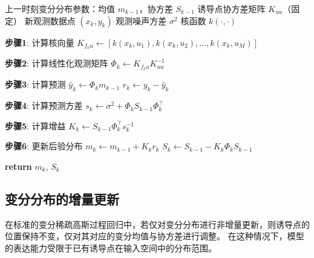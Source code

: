 \begin{algorithm}[htbp]
    \caption{在线变分稀疏高斯过程更新}
    \label{alg:online_vsgp_update}
    \begin{algorithmic}[1]
        \Require 
        \Statex 上一时刻变分分布参数：均值 $m_{k-1}$，协方差 $S_{k-1}$
        \Statex 诱导点协方差矩阵 $K_{uu}$（固定）
        \Statex 新观测数据点 $(x_k, y_k)$
        \Statex 观测噪声方差 $\sigma^2$
        \Statex 核函数 $k(\cdot, \cdot)$
        
        
            \State \textbf{步骤1}: 计算核向量
            \State $K_{f_k u} \gets [k(x_k, u_1), k(x_k, u_2), \ldots, k(x_k, u_M)]$ 
            
            \State \textbf{步骤2}: 计算线性化观测矩阵
            \State $\Phi_k \gets K_{f_k u} K_{uu}^{-1}$ 
            
            \State \textbf{步骤3}: 计算预测
            \State $\hat{y}_k \gets \Phi_k m_{k-1}$ 
            \State $r_k \gets y_k - \hat{y}_k$ 
            
            \State \textbf{步骤4}: 计算预测方差
            \State $s_k \gets \sigma^2 + \Phi_k S_{k-1} \Phi_k^\top$ 
            
            \State \textbf{步骤5}: 计算增益
            \State $K_k \gets S_{k-1} \Phi_k^\top s_k^{-1}$ 
            
            \State \textbf{步骤6}: 更新后验分布
            \State $m_k \gets m_{k-1} + K_k r_k$ 
            \State $S_k \gets S_{k-1} - K_k \Phi_k S_{k-1}$ 
            
            \State \textbf{return} $m_k$, $S_k$
        \EndFunction
    \end{algorithmic}
\end{algorithm}

\subsection{变分分布的增量更新}

在标准的变分稀疏高斯过程回归中，若仅对变分分布进行非增量更新，则诱导点的位置保持不变，仅对其对应的变分均值与协方差进行调整。
在这种情况下，模型的表达能力受限于已有诱导点在输入空间中的分布范围。


